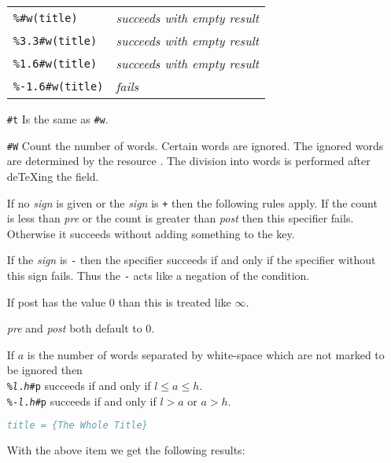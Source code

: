\documentclass[11pt,a4paper]{scrbook}
\begin{document}
\begin{itemize}
\begin{Example}
      \begin{tabular}{ll}
        \texttt{\%\#w(title)}	& \textit{succeeds with empty result}\\
        \texttt{\%3.3\#w(title)}	& \textit{succeeds with empty result}\\
        \texttt{\%1.6\#w(title)}	& \textit{succeeds with empty result}\\
        \texttt{\%-1.6\#w(title)}	& \textit{fails}
      \end{tabular}
    \end{Example}

   \item [\texttt{\#t}] Is the same as \texttt{\#w}.
     
   \item [\texttt{\#W}] Count the number of words. Certain
     words are ignored. The ignored words are determined by the resource
     . The division into words is performed after
     de\TeX{}ing the field.

     If no \textit{sign} is given or the \textit{sign} is \verb|+| then the
     following rules apply. If the count is less than \textit{pre} or the
     count is greater than \textit{post} then this specifier fails. Otherwise
     it succeeds without adding something to the key.

     If the \textit{sign} is \verb|-| then the specifier succeeds if and only
     if the specifier without this sign fails. Thus the \verb|-| acts like a
     negation of the condition.

     If post has the value 0 than this is treated like \(\infty\).

     \textit{pre} and \textit{post} both default to 0.

     If \(a\) is the number of words separated by white-space which are
     not marked to be ignored then\\
     \texttt{\%\textit{l}.\textit{h}\#p} succeeds if and only if
     \(l\leq a\leq h\).\\
     \texttt{\%-\textit{l}.\textit{h}\#p} succeeds if and only if \(l>a\) or
     \(a>h\).

     \begin{Example}
      \begin{lstlisting}[language=BibTeX]
  title = {The Whole Title}
      \end{lstlisting}\vspace{-2ex}
       With the above item we get the following results:


\end{Example}
\end{itemize}
\end{document}
